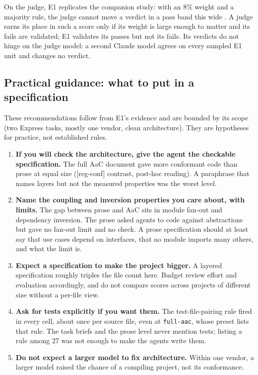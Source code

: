 \documentclass[10pt,a4paper]{article}
\newcommand{\regC}{\textsf{\scriptsize[reg-conf]}}  %
\newcommand{\lev}[1]{\texttt{\small #1}}
\begin{document}
On the judge, E1 replicates the companion study: with an 8\% weight and a majority rule, the judge cannot move a
verdict in a pass band this wide \cite{daedalus2026tool}. A judge earns its place in such a score only if its weight
is large enough to matter and its fails are validated; E1 validates its passes but not its fails. Its verdicts do
not hinge on the judge model: a second Claude model agrees on every sampled E1 unit and changes no verdict.

\subsection{Practical guidance: what to put in a specification}

These recommendations follow from E1's evidence and are bounded by its scope (two Express tasks, mostly one vendor,
clean architecture). They are hypotheses for practice, not established rules.
\begin{enumerate}
  \item \textbf{If you will check the architecture, give the agent the checkable specification.} The full AaC
        document gave more conformant code than prose at equal size (\regC{} contrast, post-hoc reading). A paraphrase
        that names layers but not the measured properties was the worst level.
  \item \textbf{Name the coupling and inversion properties you care about, with limits.} The gap between prose and
        AaC sits in module fan-out and dependency inversion. The prose asked agents to code against abstractions
        but gave no fan-out limit and no check. A prose specification
        should at least say that use cases depend on interfaces, that no module imports many others, and what the
        limit is.
  \item \textbf{Expect a specification to make the project bigger.} A layered specification roughly triples the
        file count here. Budget review effort and evaluation accordingly, and do not compare scores across projects
        of different size without a per-file view.
  \item \textbf{Ask for tests explicitly if you want them.} The test-file-pairing rule fired in every cell, about
        once per source file, even at \lev{full-aac}, whose preset lists that rule. The task briefs and the prose
        level never mention tests; listing a rule among 27 was not enough to make the agents write them.
  \item \textbf{Do not expect a larger model to fix architecture.} Within one vendor, a larger model raised the
        chance of a compiling project, not its conformance.
\end{enumerate}
\end{document}
